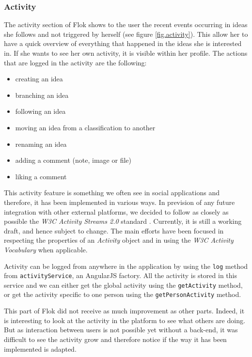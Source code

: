 \documentclass[a4paper,12pt, oneside]{article}
\begin{document}
\subsubsection{Activity}
The activity section of Flok shows to the user the recent events occurring in ideas she follows and not triggered by herself (see figure \ref{fig.activity}).
This allow her to have a quick overview of everything that happened in the ideas she is interested in.
If she wants to see her own activity, it is visible within her profile.
The actions that are logged in the activity are the following:
\begin{multicols}{2}
    \begin{itemize}
        \item creating an idea
        \item branching an idea
        \item following an idea
        \item moving an idea from a classification to another
        \item renaming an idea
        \item adding a comment (note, image or file)
        \item liking a comment
    \end{itemize}
\end{multicols}

This activity feature is something we often see in social applications and therefore, it has been implemented in various ways.
In prevision of any future integration with other external platforms, we decided to follow as closely as possible the \emph{W3C Activity Streams 2.0} standard \cite{snell2015AS2}.
Currently, it is still a working draft, and hence subject to change.
The main efforts have been focused in respecting the properties of an \emph{Activity} object and in using the \emph{W3C Activity Vocabulary} \cite{snell2015AV} when applicable.

Activity can be logged from anywhere in the application by using the \texttt{log} method from \texttt{activityService}, an AngularJS factory.
All the activity is stored in this service and we can either get the global activity using the \texttt{getActivity} method, or get the activity specific to one person using the \texttt{getPersonActivity} method.

This part of Flok did not receive as much improvement as other parts.
Indeed, it is interesting to look at the activity in the platform to see what others are doing.
But as interaction between users is not possible yet without a back-end, it was difficult to see the activity grow and therefore notice if the way it has been implemented is adapted.
\end{document}
